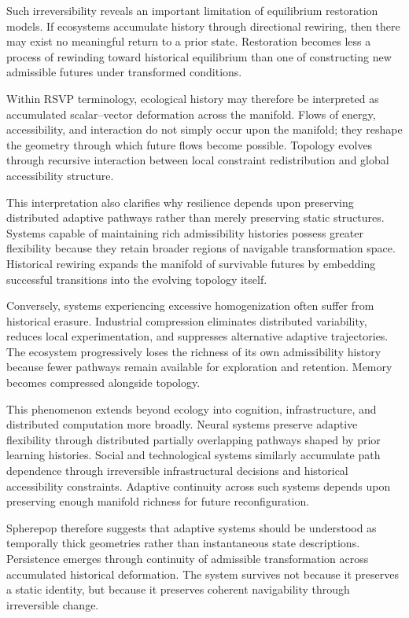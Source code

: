 \documentclass[11pt,a4paper]{article}
\begin{document}
Such irreversibility reveals an important limitation of equilibrium restoration models. If ecosystems accumulate history through directional rewiring, then there may exist no meaningful return to a prior state. Restoration becomes less a process of rewinding toward historical equilibrium than one of constructing new admissible futures under transformed conditions.

Within RSVP terminology, ecological history may therefore be interpreted as accumulated scalar--vector deformation across the manifold. Flows of energy, accessibility, and interaction do not simply occur upon the manifold; they reshape the geometry through which future flows become possible. Topology evolves through recursive interaction between local constraint redistribution and global accessibility structure.

This interpretation also clarifies why resilience depends upon preserving distributed adaptive pathways rather than merely preserving static structures. Systems capable of maintaining rich admissibility histories possess greater flexibility because they retain broader regions of navigable transformation space. Historical rewiring expands the manifold of survivable futures by embedding successful transitions into the evolving topology itself.

Conversely, systems experiencing excessive homogenization often suffer from historical erasure. Industrial compression eliminates distributed variability, reduces local experimentation, and suppresses alternative adaptive trajectories. The ecosystem progressively loses the richness of its own admissibility history because fewer pathways remain available for exploration and retention. Memory becomes compressed alongside topology.

This phenomenon extends beyond ecology into cognition, infrastructure, and distributed computation more broadly. Neural systems preserve adaptive flexibility through distributed partially overlapping pathways shaped by prior learning histories. Social and technological systems similarly accumulate path dependence through irreversible infrastructural decisions and historical accessibility constraints. Adaptive continuity across such systems depends upon preserving enough manifold richness for future reconfiguration.

Spherepop therefore suggests that adaptive systems should be understood as temporally thick geometries rather than instantaneous state descriptions. Persistence emerges through continuity of admissible transformation across accumulated historical deformation. The system survives not because it preserves a static identity, but because it preserves coherent navigability through irreversible change.
\end{document}
